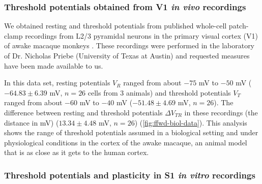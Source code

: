 \subsubsection*{Threshold potentials obtained from V1 \textit{in vivo} recordings}

We obtained resting and threshold potentials
        from published whole-cell patch-clamp recordings
        from L2/3 pyramidal neurons in the primary visual cortex (V1)
        of awake macaque monkeys \citep{Li2020-ej}.
    These recordings were performed
        in the laboratory of Dr. Nicholas Priebe (University of Texas at Austin)
        and requested measures have been made available to us.



In this data set, resting potentials $V_R$ ranged from about $-75$ mV to $-50$ mV
            ($-64.83 \pm 6.39$ mV,
            $n = 26$ cells from 3 animals)
        and threshold potentials $V_T$ ranged from about $-60$ mV to $-40$ mV
            ($-51.48 \pm 4.69$ mV,
            $n = 26$).
    The difference between resting and threshold potentials
        $\Delta V_{TR}$ in these recordings (the distance in mV)
            ($13.34 \pm 4.48$ mV,
            $n = 26$)
        (\autoref{fig:ffwd-biol-data}).
    This analysis shows the range of threshold potentials assumed
        in a biological setting and under physiological conditions
        in the cortex of the awake macaque,
        an animal model that is as close as it gets to the human cortex.

\subsubsection*{Threshold potentials and plasticity in S1 \textit{in vitro} recordings}

